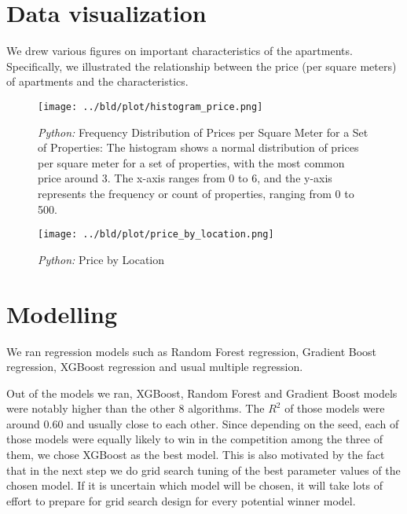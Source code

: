 \documentclass[11pt, a4paper, leqno]{article}
\begin{document}
\section{Data visualization} %
\label{sec:data_model}

We drew various figures on important characteristics of the apartments. Specifically, we illustrated the relationship between the price (per
square meters) of apartments and the characteristics.

\begin{frame}[t]
    \begin{figure}[H]

        \centering
        \texttt{[image: ../bld/plot/histogram\_price.png]}

        \caption{\emph{Python:} Frequency Distribution of Prices per Square Meter for a Set of Properties:
        The histogram shows a normal distribution of prices per square meter for a set of properties, with the most common price around 3.
        The x-axis ranges from 0 to 6, and the y-axis represents the frequency or count of properties, ranging from 0 to 500.}
        \label{fig:histogram_price}
    \end{figure}
\end{frame}

\begin{frame}[t]
    \begin{figure}[H]

        \centering
        \texttt{[image: ../bld/plot/price\_by\_location.png]}

        \caption{\emph{Python:} Price by Location}
        \label{fig:loc_price}
    \end{figure}
\end{frame}

\section{Modelling} %
\label{sec:data_model}

We ran regression models such as Random Forest regression, Gradient Boost regression, XGBoost regression and usual multiple regression.

Out of the models we ran, XGBoost, Random Forest and Gradient Boost models were notably higher than the other 8 algorithms. The $R^{2}$ of
those models were around 0.60 and usually close to each other. Since depending on the seed, each of those models were equally likely to win in the competition
among the three of them, we chose XGBoost as the best model. This is also motivated by the fact that in the next step we do grid search
tuning of the best parameter values of the chosen model. If it is uncertain which model will be chosen, it will take lots of effort to
prepare for grid search design for every potential winner model.
\end{document}
